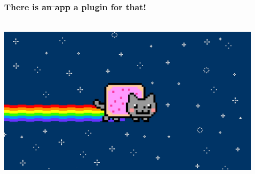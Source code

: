 \documentclass{beamer}
\begin{document}
\begin{frame}


    \frametitle{\textbf{There is \sout{an app} a plugin for that!}}

 \begin{columns}
 \begin{column}{0.45\textwidth}
         \includegraphics[height=7.5cm]{./pics/nyancat.jpg}
 \end{column}
 \begin{column}{0.65\textwidth}
 \end{column}
\end{columns}

\end{frame}
\end{document}
